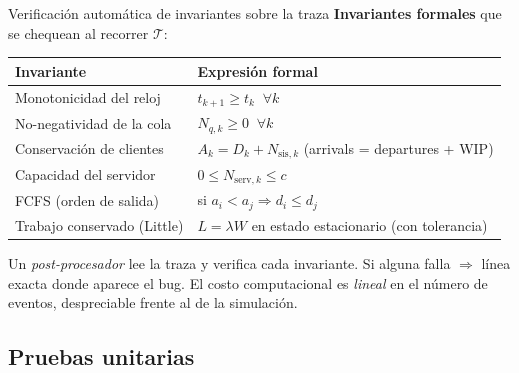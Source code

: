 \documentclass[aspectratio=1610, 10pt]{beamer}
\begin{document}
\begin{frame}{Verificación automática de invariantes sobre la traza}
  \textbf{Invariantes formales} que se chequean al recorrer $\mathcal{T}$:

  \vspace{4pt}
  \footnotesize
  \begin{center}
    \renewcommand{\arraystretch}{1.25}
    \begin{tabular}{p{4.5cm} p{8.5cm}}
      \toprule
      \textbf{Invariante} & \textbf{Expresión formal} \\
      \midrule
      Monotonicidad del reloj      & $t_{k+1} \geq t_k \;\;\forall k$ \\
      No-negatividad de la cola    & $N_{q,k} \geq 0 \;\;\forall k$ \\
      Conservación de clientes     & $A_k = D_k + N_{\text{sis},k}$
                                     (arrivals = departures + WIP) \\
      Capacidad del servidor       & $0 \leq N_{\text{serv},k} \leq c$ \\
      FCFS (orden de salida)       & si $a_i < a_j \Rightarrow d_i \leq d_j$ \\
      Trabajo conservado (Little)  & $L = \lambda W$ en estado estacionario
                                     (con tolerancia) \\
      \bottomrule
    \end{tabular}
  \end{center}

  \vspace{6pt}
  \begin{metodobox}[Implementación]
    \footnotesize
    Un \emph{post-procesador} lee la traza y verifica cada invariante.
    Si alguna falla $\Rightarrow$ línea exacta donde aparece el bug.
    El costo computacional es \emph{lineal} en el número de eventos,
    despreciable frente al de la simulación.
  \end{metodobox}
\end{frame}

\subsection{Pruebas unitarias}
\end{document}
